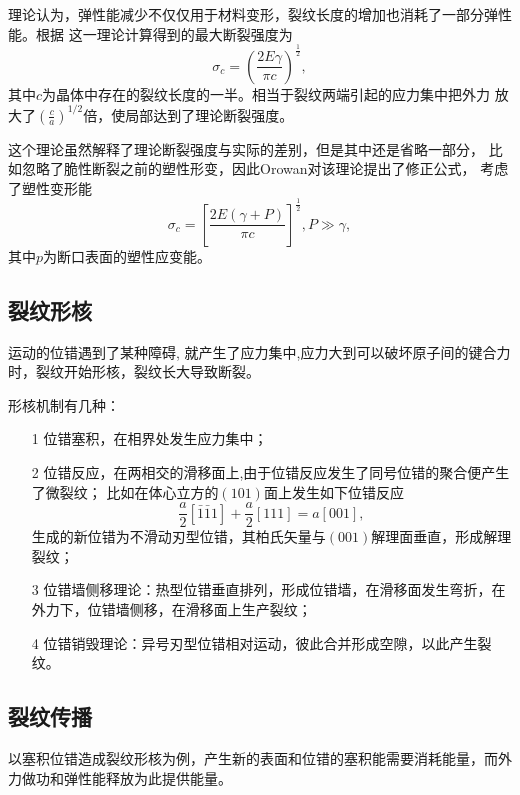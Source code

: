             理论认为，弹性能减少不仅仅用于材料变形，裂纹长度的增加也消耗了一部分弹性能。根据
            这一理论计算得到的最大断裂强度为
            \begin{equation}
                \sigma_c=\left( \frac{2E\gamma}{\pi c} \right)^{\frac{1}{2}},
            \end{equation}
            其中$c$为晶体中存在的裂纹长度的一半。相当于裂纹两端引起的应力集中把外力
            放大了$\left( \frac{c}{a} \right)^{1/2}$倍，使局部达到了理论断裂强度。
        
            这个理论虽然解释了理论断裂强度与实际的差别，但是其中还是省略一部分，
            比如忽略了脆性断裂之前的塑性形变，因此Orowan对该理论提出了修正公式，
            考虑了塑性变形能
            \begin{equation}
                \sigma_c=\left[ \frac{2E(\gamma+P)}{\pi c} \right]^{\frac{1}{2}},P\gg\gamma,
            \end{equation}
            其中$p$为断口表面的塑性应变能。
        \subsection{裂纹形核}
            运动的位错遇到了某种障碍, 就产生了应力集中,应力大到可以破坏原子间的键合力时，裂纹开始形核，裂纹长大导致断裂。
            
            形核机制有几种：
            \begin{itemize}
                \item[1] 位错塞积，在相界处发生应力集中；
                \item[2] 位错反应，在两相交的滑移面上,由于位错反应发生了同号位错的聚合便产生了微裂纹；
                            比如在体心立方的$(101)$面上发生如下位错反应
                            \begin{equation}
                                \frac{a}{2}[\bar{1}\bar{1}1]+\frac{a}{2}[111]=a[001],
                            \end{equation} 
                            生成的新位错为不滑动刃型位错，其柏氏矢量与$(001)$解理面垂直，形成解理裂纹；
                \item[3] 位错墙侧移理论：热型位错垂直排列，形成位错墙，在滑移面发生弯折，在外力下，位错墙侧移，在滑移面上生产裂纹；
                \item[4] 位错销毁理论：异号刃型位错相对运动，彼此合并形成空隙，以此产生裂纹。
            \end{itemize}
        \subsection{裂纹传播}
            以塞积位错造成裂纹形核为例，产生新的表面和位错的塞积能需要消耗能量，而外力做功和弹性能释放为此提供能量。

